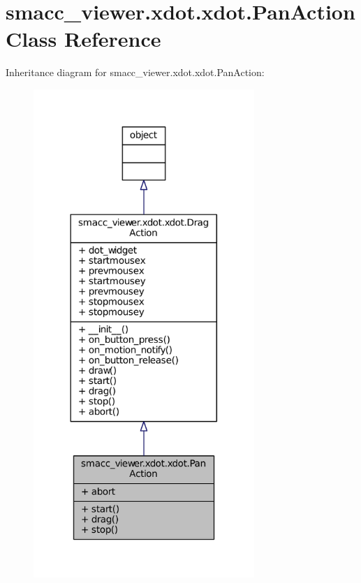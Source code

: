\hypertarget{classsmacc__viewer_1_1xdot_1_1xdot_1_1PanAction}{}\section{smacc\+\_\+viewer.\+xdot.\+xdot.\+Pan\+Action Class Reference}
\label{classsmacc__viewer_1_1xdot_1_1xdot_1_1PanAction}


Inheritance diagram for smacc\+\_\+viewer.\+xdot.\+xdot.\+Pan\+Action\+:
\nopagebreak
\begin{figure}[H]
\begin{center}
\leavevmode
\includegraphics[width=237pt]{classsmacc__viewer_1_1xdot_1_1xdot_1_1PanAction__inherit__graph}
\end{center}
\end{figure}


